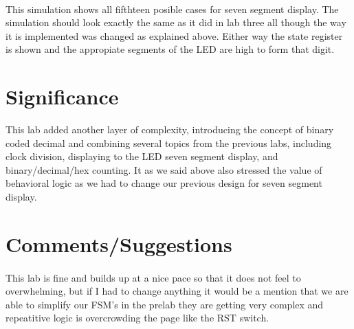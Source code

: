 \documentclass[12pt]{report}
\begin{document}
			\paragraph*{}
				This simulation shows all fifthteen posible cases for seven segment display.  The 
				simulation should look exactly the same as it did in lab three all though the way
				it is implemented was changed as explained above.  Either way the state register 
				is shown and the appropiate segments of the LED are high to form that digit.

\section*{Significance}
	This lab added another layer of complexity, introducing the concept of binary coded decimal and combining several topics from the previous labs, including clock division, displaying to the LED seven segment display, and binary/decimal/hex counting.  It as we said above also 
	stressed the value of behavioral logic as we had to change our previous design for seven 
	segment display.
			
\section*{Comments/Suggestions}
	\paragraph{}
		This lab is fine and builds up at a nice pace so that it does not feel to overwhelming, 
		but if I had to change anything it would be a mention that we are able to simplify our
		FSM's in the prelab they are getting very complex and repeatitive logic is overcrowding 
		the page like the RST switch.
		
\end{document}
